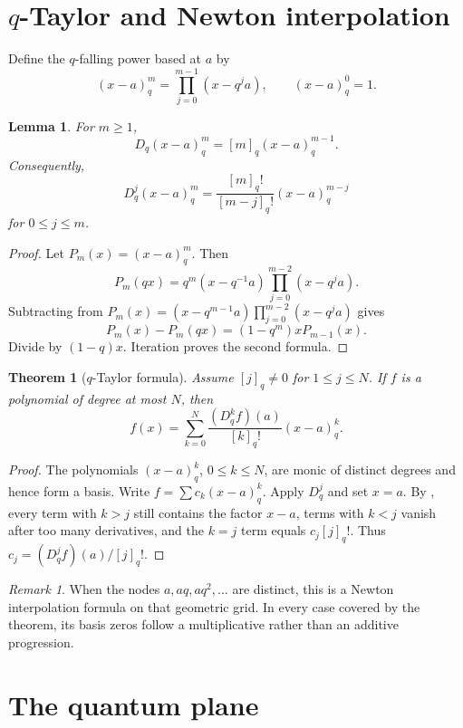 \documentclass[11pt,oneside,openany]{book}
\newtheorem{theorem}{Theorem}[chapter]
\newtheorem{lemma}[lemma]{Lemma}
\theoremstyle{definition}
\theoremstyle{remark}
\newtheorem{remark}[remark]{Remark}
\begin{document}
\section{\texorpdfstring{$q$}{q}-Taylor and Newton interpolation}

Define the $q$-falling power based at $a$ by
\[
 (x-a)_q^m=\prod_{j=0}^{m-1}(x-q^ja),
 \qquad (x-a)_q^0=1.
\]

\begin{lemma}\label{lem:qfalling-derivative}
For $m\ge1$,
\[
 D_q(x-a)_q^m=[m]_q(x-a)_q^{m-1}.
\]
Consequently,
\[
 D_q^j(x-a)_q^m
 =\frac{[m]_q!}{[m-j]_q!}(x-a)_q^{m-j}
\]
for $0\le j\le m$.
\end{lemma}

\begin{proof}
Let $P_m(x)=(x-a)_q^m$.  Then
\[
 P_m(qx)=q^m(x-q^{-1}a)\prod_{j=0}^{m-2}(x-q^ja).
\]
Subtracting from
\(
 P_m(x)=(x-q^{m-1}a)\prod_{j=0}^{m-2}(x-q^ja)
\)
gives
\[
 P_m(x)-P_m(qx)=(1-q^m)xP_{m-1}(x).
\]
Divide by $(1-q)x$.  Iteration proves the second formula.
\end{proof}

\begin{theorem}[$q$-Taylor formula]\label{thm:q-taylor}
Assume $[j]_q\ne0$ for $1\le j\le N$.  If $f$ is a polynomial of degree at most $N$, then
\[
 f(x)=\sum_{k=0}^{N}\frac{(D_q^kf)(a)}{[k]_q!}(x-a)_q^k.
\]
\end{theorem}

\begin{proof}
The polynomials $(x-a)_q^k$, $0\le k\le N$, are monic of distinct degrees and hence form a basis.  Write
\(
 f=\sum c_k(x-a)_q^k.
\)
Apply $D_q^j$ and set $x=a$.  By , every term with $k>j$ still contains the factor $x-a$, terms with $k<j$ vanish after too many derivatives, and the $k=j$ term equals $c_j[j]_q!$.  Thus $c_j=(D_q^jf)(a)/[j]_q!$.
\end{proof}

\begin{remark}
When the nodes $a,aq,aq^2,\ldots$ are distinct, this is a Newton interpolation formula on that geometric grid.  In every case covered by the theorem, its basis zeros follow a multiplicative rather than an additive progression.
\end{remark}

\section{The quantum plane}
\end{document}
